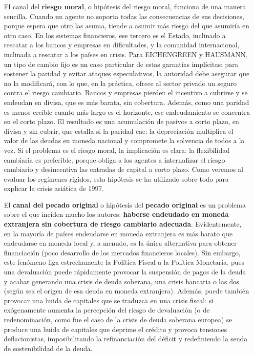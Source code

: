 \documentclass[10pt,a4paper]{article}
\begin{document}
El canal del \textbf{riesgo moral}, o hipótesis del riesgo moral, funciona de una manera sencilla. Cuando un agente no soporta todas las consecuencias de sus decisiones, porque espera que otro las asuma, tiende a asumir más riesgo del que asumiría en otro caso. En los sistemas financieros, ese tercero es el Estado, inclinado a rescatar a los bancos y empresas en dificultades, y la comunidad internacional, inclinada a rescatar a los países en crisis. Para EICHENGREEN y HAUSMANN, un tipo de cambio fijo es un caso particular de estas garantías implícitas: para sostener la paridad y evitar ataques especulativos, la autoridad debe asegurar que no la modificará, con lo que, en la práctica, ofrece al sector privado un seguro contra el riesgo cambiario. Bancos y empresas pierden el incentivo a cubrirse y se endeudan en divisa, que es más barata, sin cobertura. Además, como una paridad es menos creíble cuanto más largo es el horizonte, ese endeudamiento se concentra en el corto plazo. El resultado es una acumulación de pasivos a corto plazo, en divisa y sin cubrir, que estalla si la paridad cae: la depreciación multiplica el valor de las deudas en moneda nacional y compromete la solvencia de todos a la vez. Si el problema es el riesgo moral, la implicación es clara: la flexibilidad cambiaria es preferible, porque obliga a los agentes a internalizar el riesgo cambiario y desincentiva las entradas de capital a corto plazo. Como veremos al evaluar los regímenes rígidos, esta hipótesis se ha utilizado sobre todo para explicar la crisis asiática de 1997.

El \textbf{canal del pecado original} o hipótesis del \textbf{pecado original} es un problema sobre el que inciden mucho los autores: \textbf{haberse endeudado en moneda extranjera sin cobertura de riesgo cambiario adecuada}. Evidentemente, en la mayoría de países endeudarse en moneda extranjera es más barato que endeudarse en moneda local y, a menudo, es la única alternativa para obtener financiación (poco desarrollo de los mercados financieros locales). Sin embargo, este fenómeno liga estrechamente la Política Fiscal a la Política Monetaria, pues una devaluación puede rápidamente provocar la suspensión de pagos de la deuda y acabar generando una crisis de deuda soberana, una crisis bancaria o las dos (según sea el origen de esa deuda en moneda extranjera). Además, puede también provocar una huida de capitales que se traduzca en una crisis fiscal: si exógenamente aumenta la percepción del riesgo de devaluación (o de redenominación, como fue el caso de la crisis de deuda soberana europea) se produce una huida de capitales que deprime el crédito y provoca tensiones deflacionistas, imposibilitando la refinanciación del déficit y redefiniendo la senda de sostenibilidad de la deuda.
\end{document}
